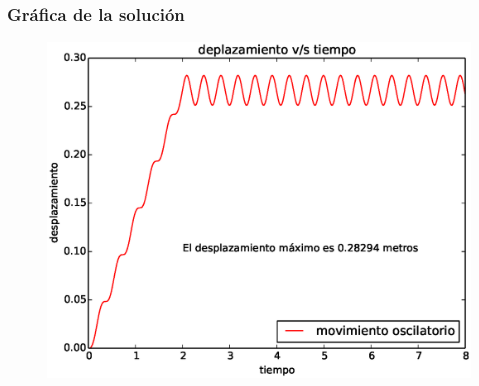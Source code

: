 \begin{frame}[fragile]
\frametitle{Gráfica de la solución}
\begin{figure}
	\centering
	\includegraphics[scale=0.5]{Examen3_P3_01.eps}  
\end{figure}
\end{frame}

